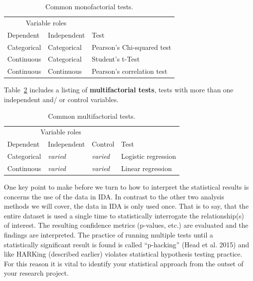 \documentclass[
  letterpaper,
]{scrbook}
\begin{document}
\hypertarget{tbl-ida-statistical-monofactorial-listing}{}
\begin{table}
\caption{\label{tbl-ida-statistical-monofactorial-listing}Common monofactorial tests. }\tabularnewline

\centering
\begin{tabular}{lll}
\toprule
\multicolumn{2}{c}{Variable roles} & \multicolumn{1}{c}{ } \\
\cmidrule(l{3pt}r{3pt}){1-2}
Dependent & Independent & Test\\
\midrule
Categorical & Categorical & Pearson's Chi-squared test\\
Continuous & Categorical & Student's t-Test\\
Continuous & Continuous & Pearson's correlation test\\
\bottomrule
\end{tabular}
\end{table}

Table~\ref{tbl-ida-statistical-multifactorial-listing} includes a
listing of \textbf{multifactorial tests}, tests with more than one
independent and/ or control variables.

\hypertarget{tbl-ida-statistical-multifactorial-listing}{}
\begin{table}
\caption{\label{tbl-ida-statistical-multifactorial-listing}Common multifactorial tests. }\tabularnewline

\centering
\begin{tabular}{l>{}l>{}ll}
\toprule
\multicolumn{3}{c}{Variable roles} & \multicolumn{1}{c}{ } \\
\cmidrule(l{3pt}r{3pt}){1-3}
Dependent & Independent & Control & Test\\
\midrule
Categorical & \em{varied} & \em{varied} & Logistic regression\\
Continuous & \em{varied} & \em{varied} & Linear regression\\
\bottomrule
\end{tabular}
\end{table}

One key point to make before we turn to how to interpret the statistical
results is concerns the use of the data in IDA. In contrast to the other
two analysis methods we will cover, the data in IDA is only used once.
That is to say, that the entire dataset is used a single time to
statistically interrogate the relationship(s) of interest. The resulting
confidence metrics (p-values, etc.) are evaluated and the findings are
interpreted. The practice of running multiple tests until a
statistically significant result is found is called ``p-hacking'' (Head
et al. 2015) and like HARKing (described earlier) violates statistical
hypothesis testing practice. For this reason it is vital to identify
your statistical approach from the outset of your research project.
\end{document}

